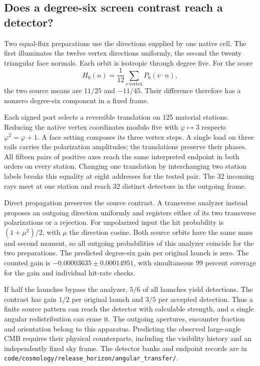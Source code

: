 \documentclass[11pt]{article}
\newcommand{\pathref}[1]{\nolinkurl{#1}}
\theoremstyle{remark}
\begin{document}
\subsection{Does a degree-six screen contrast reach a detector?}
Two equal-flux preparations use the directions supplied by one native
cell. The first illuminates the twelve vertex directions uniformly, the
second the twenty triangular face normals. Each orbit is isotropic
through degree five. For the score
\[
 H_6(n)=\frac{1}{12}\sum_{v\,\mathrm{vertex}}P_6(v\cdot n),
\]
the two source means are \(11/25\) and \(-11/45\). Their difference
therefore has a nonzero degree-six component in a fixed frame.

Each signed port selects a reversible translation on 125 material
stations. Reducing the native vertex coordinates modulo five with
\(\varphi\mapsto3\) respects \(\varphi^2=\varphi+1\). A face setting
composes its three vertex steps. A single load on three rails carries
the polarization amplitudes; the translations preserve their phases.
All fifteen pairs of positive axes reach the same interpreted endpoint
in both orders on every station. Changing one translation by
interchanging two station labels breaks this equality at eight
addresses for the tested pair. The 32 incoming rays meet at one
station and reach 32 distinct detectors in the outgoing frame.

Direct propagation preserves the source contrast. A transverse analyzer
instead proposes an outgoing direction uniformly and registers either
of its two transverse polarizations or a rejection. For unpolarized
input the hit probability is \((1+\mu^2)/2\), with \(\mu\) the
direction cosine. Both source orbits have the same mass and second
moment, so all outgoing probabilities of this analyzer coincide for the
two preparations. The predicted degree-six gain per original launch is
zero. The counted gain is \(-0.00003635\pm0.00014951\), with simultaneous
99 percent coverage for the gain and individual hit-rate checks.

If half the launches bypass the analyzer, \(5/6\) of all launches
yield detections. The contrast has gain \(1/2\) per original launch
and \(3/5\) per accepted detection. Thus a finite source pattern can
reach the detector with calculable strength, and a single angular
redistribution can erase it. The outgoing apertures, encounter fraction
and orientation belong to this apparatus. Predicting the observed
large-angle CMB requires their physical counterparts, including the
visibility history and an independently fixed sky frame.
The detector banks and endpoint records are in
\mbox{\pathref{code/cosmology/release_horizon/angular_transfer/}}.
\end{document}
